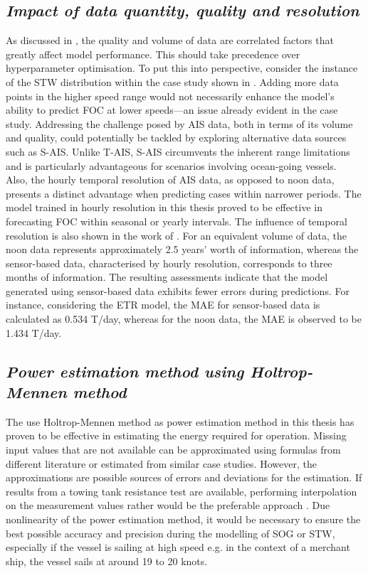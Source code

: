 \subsection*{\emph{Impact of data quantity, quality and resolution}}

As discussed in , the quality and volume of data are correlated factors that greatly affect model performance. This should take precedence over hyperparameter optimisation. To put this into perspective, consider the instance of the STW distribution within the case study shown in . Adding more data points in the higher speed range would not necessarily enhance the model's ability to predict FOC at lower speeds—an issue already evident in the case study. Addressing the challenge posed by AIS data, both in terms of its volume and quality, could potentially be tackled by exploring alternative data sources such as S-AIS. Unlike T-AIS, S-AIS circumvents the inherent range limitations and is particularly advantageous for scenarios involving ocean-going vessels.\\   

Also, the hourly temporal resolution of AIS data, as opposed to noon data, presents a distinct advantage when predicting cases within narrower periods. The model trained in hourly resolution in this thesis proved to be effective in forecasting FOC within seasonal or yearly intervals. The influence of temporal resolution is also shown in the work of . For an equivalent volume of data, the noon data represents approximately 2.5 years' worth of information, whereas the sensor-based data, characterised by hourly resolution, corresponds to three months of information. The resulting assessments indicate that the model generated using sensor-based data exhibits fewer errors during predictions. For instance, considering the ETR model, the MAE for sensor-based data is calculated as 0.534 T/day, whereas for the noon data, the MAE is observed to be 1.434 T/day.\\

\subsection*{\emph{Power estimation method using Holtrop-Mennen method}}


The use Holtrop-Mennen method as power estimation method in this thesis has proven to be effective in estimating the energy required for operation. Missing input values that are not available can be approximated using formulas from different literature or estimated from similar case studies. However, the approximations are possible sources of errors and deviations for the estimation. If results from a towing tank resistance test are available, performing interpolation on the measurement values rather would be the preferable approach . Due nonlinearity of the power estimation method, it would be necessary to ensure the best possible accuracy and precision during the modelling of SOG or STW, especially if the vessel is sailing at high speed e.g. in the context of a merchant ship, the vessel sails at around 19 to 20 knots.\\ 

